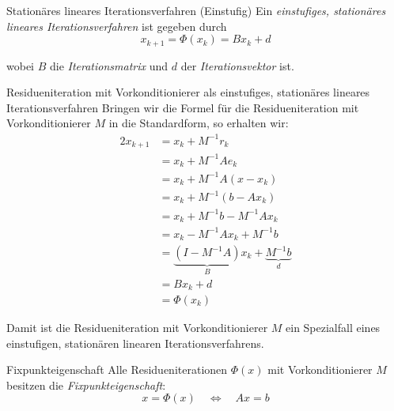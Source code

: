 \begin{defi}{Stationäres lineares Iterationsverfahren (Einstufig)}
    Ein \emph{einstufiges, stationäres lineares Iterationsverfahren} ist gegeben durch
    \[
        x_{k+1} = \Phi(x_k) = B x_k + d
    \]

    wobei $B$ die \emph{Iterationsmatrix} und $d$ der \emph{Iterationsvektor} ist.
\end{defi}

\begin{bonus}{Residueniteration mit Vorkonditionierer als einstufiges, stationäres lineares Iterationsverfahren}
    Bringen wir die Formel für die Residueniteration mit Vorkonditionierer $M$ in die Standardform, so erhalten wir:
    \begin{alignat*}{2}
        x_{k+1} & = x_k + M^{-1} r_k                                                \\
                & = x_k + M^{-1} A e_k                                              \\
                & = x_k + M^{-1} A (x - x_k)                                        \\
                & = x_k + M^{-1} (b - A x_k)                                        \\
                & = x_k + M^{-1} b - M^{-1} A x_k                                   \\
                & = x_k - M^{-1} A x_k + M^{-1} b                                   \\
                & = \underbrace{(I - M^{-1} A)}_{B} x_k + \underbrace{M^{-1} b}_{d} \\
                & = B x_k + d                                                       \\
                & = \Phi(x_k)
    \end{alignat*}

    Damit ist die Residueniteration mit Vorkonditionierer $M$ ein Spezialfall eines einstufigen, stationären linearen Iterationsverfahrens.
\end{bonus}

\begin{defi}{Fixpunkteigenschaft}
    Alle Residueniterationen $\Phi(x)$ mit Vorkonditionierer $M$ besitzen die \emph{Fixpunkteigenschaft}:
    \[
        x = \Phi(x) \quad \iff \quad Ax = b
    \]
\end{defi}


